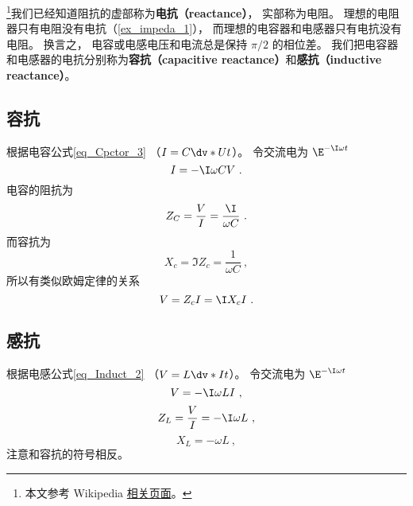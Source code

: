 

\footnote{本文参考 Wikipedia \href{https://en.wikipedia.org/wiki/Electrical_reactance}{相关页面}。}我们已经知道阻抗的虚部称为\textbf{电抗（reactance）}， 实部称为电阻。 理想的电阻器只有电阻没有电抗（\autoref{ex_impeda_1}）， 而理想的电容器和电感器只有电抗没有电阻。 换言之， 电容或电感电压和电流总是保持 $\pi/2$ 的相位差。 我们把电容器和电感器的电抗分别称为\textbf{容抗（capacitive reactance）}和\textbf{感抗（inductive reactance）}。

\subsection{容抗}
根据电容公式\autoref{eq_Cpctor_3}  （$I = C\dv*{U}{t}$）。 令交流电为 $\E^{-\I \omega t}$
\begin{equation}
I = -\I \omega CV~.
\end{equation}
电容的阻抗为
\begin{equation}
Z_C = \frac{V}{I} = \frac{\I}{\omega C}~.
\end{equation}
而容抗为
\begin{equation}
X_c = \Im{Z_c} = \frac{1}{\omega C}~,
\end{equation}
所以有类似欧姆定律的关系
\begin{equation}
V = Z_c I = \I X_c I~.
\end{equation}

\subsection{感抗}
根据电感公式\autoref{eq_Induct_2} （$V = L\dv*{I}{t}$）。 令交流电为 $\E^{-\I \omega t}$
\begin{equation}
V = -\I\omega L I~,
\end{equation}
\begin{equation}
Z_L = \frac{V}{I} = -\I\omega L~,
\end{equation}
\begin{equation}
X_L = -\omega L~,
\end{equation}
注意和容抗的符号相反。
